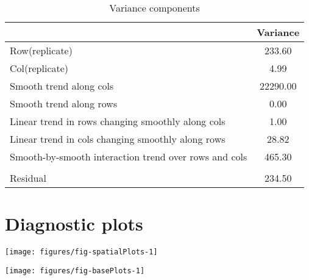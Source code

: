 \documentclass[a4paper,11pt]{article}\usepackage[]{graphicx}\usepackage[]{color}
\makeatletter
\def\maxwidth{ %
  \ifdim\Gin@nat@width>\linewidth
    \linewidth
  \else
    \Gin@nat@width
  \fi
}
\newenvironment{knitrout}{}{} %
\makeatother
\begin{document}
\begin{table}[ht]
\begin{flushleft}
\caption{Variance components} 
\label{varComps}
\begin{tabular}{lc}
  \hline
 & Variance \\ 
  \hline
Row(replicate) & 233.60 \\ 
  Col(replicate) & 4.99 \\ 
  Smooth trend along cols & 22290.00 \\ 
  Smooth trend along rows & 0.00 \\ 
  Linear trend in rows changing smoothly along cols & 1.00 \\ 
  Linear trend in cols changing smoothly along rows & 28.82 \\ 
  Smooth-by-smooth interaction trend over rows and cols & 465.30 \\ 
   &  \\ 
  Residual & 234.50 \\ 
   \hline
\end{tabular}
\end{flushleft}
\end{table}

\clearpage

\section{Diagnostic plots}
\begin{knitrout}
\color{fgcolor}

{\centering \texttt{[image: figures/fig-spatialPlots-1]} 

}



\end{knitrout}
\newpage
\begin{knitrout}
\color{fgcolor}

{\centering \texttt{[image: figures/fig-basePlots-1]} 

}



\end{knitrout}
\newpage

\end{document}
